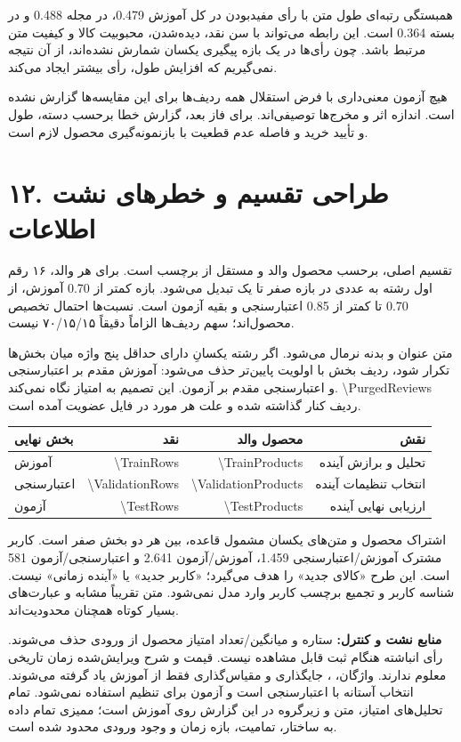 \documentclass[a4paper,12pt]{article}
\newcommand{\pageheading}[1]{\section*{\color{ink}#1}}
\begin{document}
همبستگی رتبه‌ای طول متن با رأی مفیدبودن در کل آموزش \num{0.479}، در مجله \num{0.488} و در بسته \num{0.364} است. این رابطه می‌تواند با سن نقد، دیده‌شدن، محبوبیت کالا و کیفیت متن مرتبط باشد. چون رأی‌ها در یک بازه پیگیری یکسان شمارش نشده‌اند، از آن نتیجه نمی‌گیریم که افزایش طول، رأی بیشتر ایجاد می‌کند.

هیچ آزمون معنی‌داری با فرض استقلال همه ردیف‌ها برای این مقایسه‌ها گزارش نشده است. اندازه اثر و مخرج‌ها توصیفی‌اند. برای فاز بعد، گزارش خطا برحسب دسته، طول و تأیید خرید و فاصله عدم قطعیت با بازنمونه‌گیری محصول لازم است.
\newpage

\pageheading{۱۲. طراحی تقسیم و خطرهای نشت اطلاعات}
تقسیم اصلی، برحسب محصول والد و مستقل از برچسب است. برای هر والد، ۱۶ رقم اول  رشته  به عددی در بازه صفر تا یک تبدیل می‌شود. بازه کمتر از \num{0.70} آموزش، از \num{0.70} تا کمتر از \num{0.85} اعتبارسنجی و بقیه آزمون است. نسبت‌ها احتمال تخصیص محصول‌اند؛ سهم ردیف‌ها الزاماً دقیقاً ۷۰/۱۵/۱۵ نیست.

متن عنوان و بدنه نرمال می‌شود. اگر رشته یکسانِ دارای حداقل پنج واژه میان بخش‌ها تکرار شود، ردیف بخش با اولویت پایین‌تر حذف می‌شود: آموزش مقدم بر اعتبارسنجی و اعتبارسنجی مقدم بر آزمون. این تصمیم به امتیاز نگاه نمی‌کند. \num{\PurgedReviews} ردیف کنار گذاشته شده و علت هر مورد در فایل عضویت آمده است.

\begin{center}
\begin{tabular}{lrrr}
\toprule
بخش نهایی & نقد & محصول والد & نقش\\
\midrule
آموزش & \num{\TrainRows} & \num{\TrainProducts} & تحلیل و برازش آینده\\
اعتبارسنجی & \num{\ValidationRows} & \num{\ValidationProducts} & انتخاب تنظیمات آینده\\
آزمون & \num{\TestRows} & \num{\TestProducts} & ارزیابی نهایی آینده\\
\bottomrule
\end{tabular}
\end{center}
اشتراک محصول و متن‌های یکسان مشمول قاعده، بین هر دو بخش صفر است. کاربر مشترک آموزش/اعتبارسنجی \num{1,459}، آموزش/آزمون \num{2,641} و اعتبارسنجی/آزمون \num{581} است. این طرح «کالای جدید» را هدف می‌گیرد؛ «کاربر جدید» یا «آینده زمانی» نیست. شناسه کاربر و تجمیع برچسب کاربر وارد مدل نمی‌شود. متن تقریباً مشابه و عبارت‌های بسیار کوتاه همچنان محدودیت‌اند.

\textbf{منابع نشت و کنترل:} ستاره و میانگین/تعداد امتیاز محصول از ورودی حذف می‌شوند. رأی انباشته هنگام ثبت قابل مشاهده نیست. قیمت و شرح ویرایش‌شده زمان تاریخی معلوم ندارند. واژگان، ، جایگذاری و مقیاس‌گذاری فقط از آموزش یاد گرفته می‌شوند. انتخاب آستانه با اعتبارسنجی است و آزمون برای تنظیم استفاده نمی‌شود. تمام تحلیل‌های امتیاز، متن و زیرگروه در این گزارش روی آموزش است؛ ممیزی تمام داده به ساختار، تمامیت، بازه زمان و وجود ورودی محدود شده است.
\newpage
\end{document}
